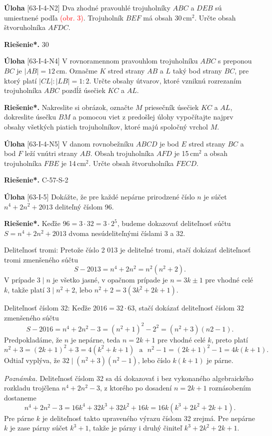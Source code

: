 \documentclass{article}
\newcommand{\rieh}{\textbf{Riešenie*.} }
\newcommand\todo[1]{\noindent\textcolor{red}{(#1)}}
\newcommand{\problem}[4]{
  \begin{tcolorbox}[breakable,notitle,boxrule=0pt,colback=light-gray,colframe=light-gray]
    \textbf{Úloha}
    [#1] #3
  \end{tcolorbox}
  \noindent#4
}
\begin{document}
\problem{63-I-4-N2}{}{
Dva zhodné pravouhlé trojuholníky $ABC$ a $DEB$ sú umiestnené podľa \todo{obr. 3}. Trojuholník $BEF$ má obsah 30\,cm$^2$. Určte obsah štvoruholníka $AFDC$.
}{
\rieh 30
}

\problem{63-I-4-N4}{}{
V rovnoramennom pravouhlom trojuholníku $ABC$ s preponou $BC$ je $|AB| = 12$\,cm. Označme $K$ stred strany $AB$ a $L$ taký bod strany $BC$, pre ktorý platí $|CL| : |LB|= 1 : 2$. Určte obsahy útvarov, ktoré vzniknú rozrezaním trojuholníka $ABC$ pozdĺž úsečiek $KC$ a $AL$.
}{
\rieh Nakreslite si obrázok, označte $M$ priesečník úsečiek $KC$ a $AL$, dokreslite úsečku $BM$ a pomocou viet z predošlej úlohy vypočítajte najprv obsahy všetkých piatich trojuholníkov, ktoré majú spoločný vrchol $M$.
}


\problem{63-I-4-N5}{}{
V danom rovnobežníku $ABCD$ je bod $E$ stred strany $BC$ a bod $F$ leží vnútri strany $AB$. Obsah trojuholníka $AFD$ je 15\,cm$^2$ a obsah trojuholníka $FBE$ je 14\,cm$^2$. Určte obsah štvoruholníka $FECD$.
}{
\rieh C-57-S-2
}


\problem{63-I-5}{}{Dokážte, že pre každé nepárne prirodzené číslo $n$ je súčet $n^4 + 2n^2 + 2 013$ deliteľný číslom 96.
}{
\rieh Keďže $96 = 3 \cdot 32 = 3 \cdot 2^5$, budeme dokazovať deliteľnosť súčtu $S = n^4+ 2n^2 + 2 013$ dvoma nesúdeliteľnými číslami 3 a 32.

Deliteľnosť tromi: Pretože číslo 2 013 je deliteľné tromi, stačí dokázať deliteľnosť tromi zmenšeného súčtu
$$S - 2 013 = n^4 + 2n^2= n^2(n^2+ 2).$$
V prípade $3 \mid n$ je všetko jasné, v opačnom prípade je $n = 3k \pm 1$ pre vhodné celé $k$, takže platí $3 \mid n^2 + 2$, lebo $n^2 + 2 = 3(3k^2 + 2k + 1)$.

Deliteľnosť číslom 32: Keďže $2 016 = 32 \cdot 63$, stačí dokázať deliteľnosť číslom 32 zmenšeného súčtu
$$S - 2 016 = n^4+ 2n^2 - 3 = (n^2+ 1)^2 - 2^2= (n^2+ 3)(n2 - 1).$$
Predpokladáme, že $n$ je nepárne, teda $n = 2k + 1$ pre vhodné celé $k$, preto platí
$$n^2+ 3 = (2k + 1)^2+ 3 = 4(k^2+ k + 1)\ \ \ \mathrm{a} \ \ \ n^2 - 1 = (2k + 1)^2 - 1 = 4k(k + 1).$$
Odtiaľ vyplýva, že $32 \mid (n^2 + 3)(n^2 - 1)$, lebo číslo $k(k + 1)$ je párne.

\textit{Poznámka.} Deliteľnosť číslom 32 sa dá dokazovať i bez vykonaného algebraického rozkladu trojčlena $n^4 + 2n^2 - 3$, z ktorého po dosadení $n = 2k + 1$ roznásobením dostaneme
$$n^4+ 2n^2 - 3 = 16k^4+ 32k^3+ 32k^2+ 16k = 16k(k^3+ 2k^2+ 2k + 1).$$
Pre párne $k$ je deliteľnosť takto upraveného výrazu číslom 32 zrejmá. Pre nepárne $k$ je zase párny súčet $k^3 + 1$, takže je párny i druhý činiteľ $k^3 + 2k^2 + 2k + 1$.
}
\end{document}
